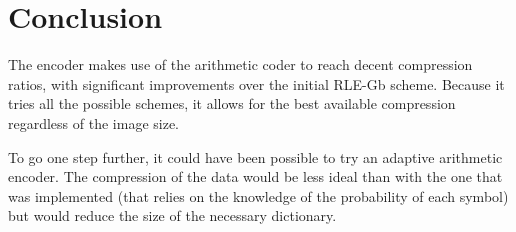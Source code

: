 \section{Conclusion}

The encoder makes use of the arithmetic coder to reach decent compression ratios, with significant improvements over the initial RLE-Gb scheme. Because it tries all the possible schemes, it allows for the best available compression regardless of the image size.

To go one step further, it could have been possible to try an adaptive arithmetic encoder. The compression of the data would be less ideal than with the one that was implemented (that relies on the knowledge of the probability of each symbol) but would reduce the size of the necessary dictionary.